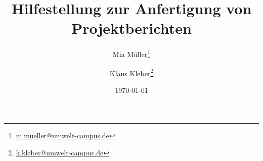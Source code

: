 %
%
\titlehead{\texttt{[image: Bilder//Logo\_UCB.pdf]}}
%
\title{Hilfestellung zur Anfertigung von Projektberichten}
%
\author{
				Mia Müller\thanks{\href{mailto:m.mueller@umwelt-campus.de}{m.mueller@umwelt-campus.de}}
				\and
				Klaus Kleber\thanks{\href{mailto:k.kleber@umwelt-campus.de}{k.kleber@umwelt-campus.de}}
				}
%
\date{\small\today}
\publishers{\vspace{1cm}\normalsize Betreuer: Dr.-Ing. Lukas Lentz}
\maketitle
%
%